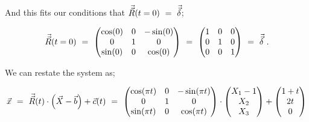 \documentclass{article}
\begin{document}
And this fits our conditions that \begin{math} \vec{\vec{R}}( t = 0 ) \hspace{0.125cm} = \hspace{0.125cm} \vec{\vec{\delta}} \end{math};

\begin{equation} \label{eb-eq-1-60}
\vec{\vec{R}}( t = 0 ) \hspace{0.125cm} =  \hspace{0.125cm} \begin{pmatrix} \cos ( 0 ) & 0 & - \sin ( 0 ) \\ 0 & 1 & 0 \\ \sin ( 0 ) & 0 & \cos ( 0 ) \end{pmatrix} \hspace{0.125cm} =  \hspace{0.125cm} \begin{pmatrix} 1 & 0 & 0 \\ 0 & 1 & 0 \\ 0 & 0 & 1 \end{pmatrix} \hspace{0.125cm} =  \hspace{0.125cm} \vec{\vec{\delta}} \hspace{0.125cm} .
\end{equation} 

\vspace{0.25cm}

We can restate the system as;

\begin{equation} \label{eb-eq-1-61}
\vec{x}  \hspace{0.125cm} =  \hspace{0.125cm} \vec{\vec{R}}( t ) \cdot \Big( \vec{X} - \vec{b} \Big) + \vec{c}( t ) \hspace{0.125cm} =  \hspace{0.125cm} \begin{pmatrix} \cos ( \pi t ) & 0 & - \sin ( \pi t ) \\ 0 & 1 & 0 \\ \sin ( \pi t ) & 0 & \cos ( \pi t ) \end{pmatrix} \cdot \begin{pmatrix} X_1 - 1 \\ X_2 \\ X_3 \end{pmatrix} + \begin{pmatrix} 1 + t \\ 2 t \\ 0 \end{pmatrix}
\end{equation} 
\end{document}
